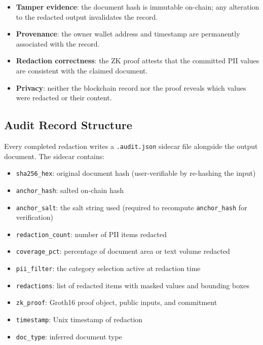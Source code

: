 \begin{itemize}
  \item \textbf{Tamper evidence}: the document
        hash is immutable on-chain; any alteration
        to the redacted output invalidates the record.
  \item \textbf{Provenance}: the owner wallet
        address and timestamp are permanently
        associated with the record.
  \item \textbf{Redaction correctness}: the ZK
        proof attests that the committed PII values
        are consistent with the claimed document.
  \item \textbf{Privacy}: neither the blockchain
        record nor the proof reveals which values
        were redacted or their content.
\end{itemize}

\subsection{Audit Record Structure}

Every completed redaction writes a
\texttt{.audit.json} sidecar file alongside the
output document.
The sidecar contains:

\begin{itemize}
  \item \texttt{sha256\_hex}: original document hash
        (user-verifiable by re-hashing the input)
  \item \texttt{anchor\_hash}: salted on-chain hash
  \item \texttt{anchor\_salt}: the salt string used
        (required to recompute \texttt{anchor\_hash}
        for verification)
  \item \texttt{redaction\_count}: number of PII
        items redacted
  \item \texttt{coverage\_pct}: percentage of document
        area or text volume redacted
  \item \texttt{pii\_filter}: the category selection
        active at redaction time
  \item \texttt{redactions}: list of redacted items
        with masked values and bounding boxes
  \item \texttt{zk\_proof}: Groth16 proof object,
        public inputs, and commitment
  \item \texttt{timestamp}: Unix timestamp of
        redaction
  \item \texttt{doc\_type}: inferred document type
\end{itemize}


